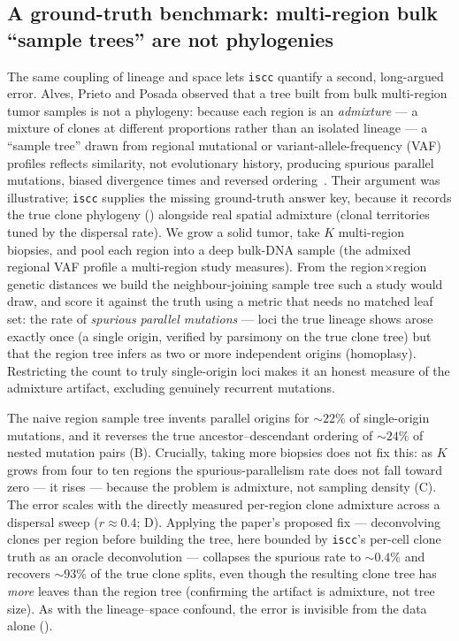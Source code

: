 \documentclass{article}
\begin{document}
\subsection{A ground-truth benchmark: multi-region bulk ``sample trees'' are not phylogenies}
\label{sec:multiregion}
The same coupling of lineage and space lets \texttt{iscc} quantify a second, long-argued error.
Alves, Prieto and Posada observed that a tree built from bulk multi-region tumor samples is not a
phylogeny: because each region is an \emph{admixture} --- a mixture of clones at different
proportions rather than an isolated lineage --- a ``sample tree'' drawn from regional mutational or
variant-allele-frequency (VAF) profiles reflects similarity, not evolutionary history, producing
spurious parallel mutations, biased divergence times and reversed ordering~\cite{alves_multiregion_2017}.
Their argument was illustrative; \texttt{iscc} supplies the missing ground-truth answer key, because
it records the true clone phylogeny () alongside real spatial admixture (clonal
territories tuned by the dispersal rate). We grow a solid tumor, take $K$ multi-region biopsies, and
pool each region into a deep bulk-DNA sample (the admixed regional VAF profile a multi-region study
measures). From the region$\times$region genetic distances we build the neighbour-joining sample tree
such a study would draw, and score it against the truth using a metric that needs no matched leaf
set: the rate of \emph{spurious parallel mutations} --- loci the true lineage shows arose exactly
once (a single origin, verified by parsimony on the true clone tree) but that the region tree infers
as two or more independent origins (homoplasy). Restricting the count to truly single-origin loci
makes it an honest measure of the admixture artifact, excluding genuinely recurrent mutations.

The naive region sample tree invents parallel origins for $\sim$$22\%$ of single-origin mutations,
and it reverses the true ancestor--descendant ordering of $\sim$$24\%$ of nested mutation pairs
(B). Crucially, taking more biopsies does not fix this: as $K$ grows from four
to ten regions the spurious-parallelism rate does not fall toward zero --- it rises --- because the
problem is admixture, not sampling density (C). The error scales with the
directly measured per-region clone admixture across a dispersal sweep ($r \approx 0.4$;
D). Applying the paper's proposed fix --- deconvolving clones per region before
building the tree, here bounded by \texttt{iscc}'s per-cell clone truth as an oracle deconvolution
--- collapses the spurious rate to $\sim$$0.4\%$ and recovers $\sim$$93\%$ of the true clone splits,
even though the resulting clone tree has \emph{more} leaves than the region tree (confirming the
artifact is admixture, not tree size). As with the lineage--space confound, the error is invisible
from the data alone ().
\end{document}
